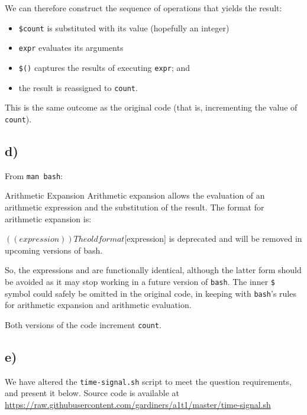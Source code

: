 \documentclass{article}
\begin{document}
We can therefore construct the sequence of operations that yields the result:
\begin{itemize}
\item \texttt{\$count} is substituted with its value (hopefully an integer)
\item \texttt{expr} evaluates its arguments
\item \texttt{\$()} captures the results of executing \texttt{expr}; and
\item the result is reassigned to \texttt{count}.
\end{itemize}

This is the same outcome as the original code (that is, incrementing the value of \texttt{count}).

\subsection{d)}

From \texttt{man bash}:

\begin{bashinline}
Arithmetic Expansion
    Arithmetic expansion allows the evaluation of an arithmetic expression and the substitution of the result.  The format for arithmetic expansion is:

        $((expression))

    The old format $[expression] is deprecated and will be removed in upcoming versions of bash.
\end{bashinline}

So, the expressions  and \bashsnippet{$[$count+1]} are functionally identical, although the latter form should be avoided as it may stop working in a future version of \texttt{bash}. The inner \texttt{\$} symbol could safely be omitted in the original code, in keeping with \texttt{bash}'s rules for arithmetic expansion and arithmetic evaluation.

Both versions of the code increment \texttt{count}.

\subsection{e)}

We have altered the \texttt{time-signal.sh} script to meet the question requirements, and present it below. Source code is available at \url{https://raw.githubusercontent.com/gardiners/a1t1/master/time-signal.sh}

\end{document}
